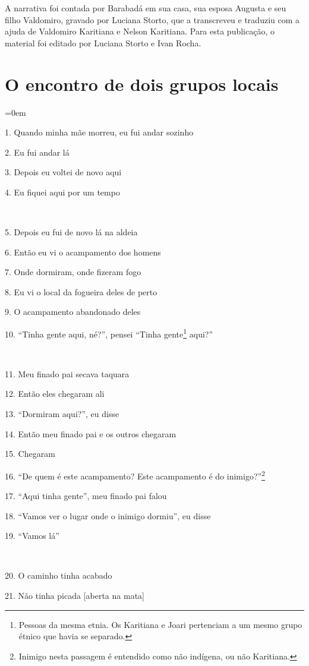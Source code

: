 A narrativa foi contada por Barabadá em sua casa, sua esposa Augusta e
seu filho Valdomiro, gravado por Luciana Storto, que a transcreveu e
traduziu com a ajuda de Valdomiro Karitiana e Nelson Karitiana. Para
esta publicação, o material foi editado por Luciana Storto e Ivan Rocha.

\chapter*{O encontro de dois grupos locais}

\begingroup\parindent=0em

1. Quando minha mãe morreu, eu fui andar sozinho

2. Eu fui andar lá

3. Depois eu voltei de novo aqui

4. Eu fiquei aqui por um tempo

~

5. Depois eu fui de novo lá na aldeia

6. Então eu vi o acampamento dos homens

7. Onde dormiram, onde fizeram fogo

8. Eu vi o local da fogueira deles de perto

9. O acampamento abandonado deles

10. ``Tinha gente aqui, né?'', pensei ``Tinha gente\footnote{Pessoas da
  mesma etnia.  Os Karitiana e Joari pertenciam a um mesmo grupo étnico
  que havia se separado.} aqui?''

~

11. Meu finado pai secava taquara

12. Então eles chegaram ali

13. ``Dormiram aqui?'', eu disse

14. Então meu finado pai e os outros chegaram

15. Chegaram

16. ``De quem é este acampamento? Este acampamento é do inimigo?''\footnote{Inimigo
  nesta passagem é entendido como não indígena, ou não Karitiana.}

17. ``Aqui tinha gente'', meu finado pai falou

18. ``Vamos ver o lugar onde o inimigo dormiu'', eu disse

19. ``Vamos lá''

~

20. O caminho tinha acabado

21. Não tinha picada {[}aberta na mata{]}


